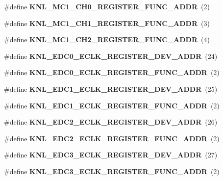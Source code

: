 \begin{DoxyCompactItemize}
\item 
\mbox{\label{types_8h_af2a15ecc6e4defaeab49cb420fd00190}} 
\#define {\bfseries K\+N\+L\+\_\+\+M\+C1\+\_\+\+C\+H0\+\_\+\+R\+E\+G\+I\+S\+T\+E\+R\+\_\+\+F\+U\+N\+C\+\_\+\+A\+D\+DR}~(2)
\item 
\mbox{\label{types_8h_a32efbe91b1b85a2d5cce155d7bc856c1}} 
\#define {\bfseries K\+N\+L\+\_\+\+M\+C1\+\_\+\+C\+H1\+\_\+\+R\+E\+G\+I\+S\+T\+E\+R\+\_\+\+F\+U\+N\+C\+\_\+\+A\+D\+DR}~(3)
\item 
\mbox{\label{types_8h_a8d12d3ada1919d5d275759e0a234c549}} 
\#define {\bfseries K\+N\+L\+\_\+\+M\+C1\+\_\+\+C\+H2\+\_\+\+R\+E\+G\+I\+S\+T\+E\+R\+\_\+\+F\+U\+N\+C\+\_\+\+A\+D\+DR}~(4)
\item 
\mbox{\label{types_8h_ac64c56290edd8bc0e35bf6284299458f}} 
\#define {\bfseries K\+N\+L\+\_\+\+E\+D\+C0\+\_\+\+E\+C\+L\+K\+\_\+\+R\+E\+G\+I\+S\+T\+E\+R\+\_\+\+D\+E\+V\+\_\+\+A\+D\+DR}~(24)
\item 
\mbox{\label{types_8h_a813ec8acab112cc0ee58659e36bd052a}} 
\#define {\bfseries K\+N\+L\+\_\+\+E\+D\+C0\+\_\+\+E\+C\+L\+K\+\_\+\+R\+E\+G\+I\+S\+T\+E\+R\+\_\+\+F\+U\+N\+C\+\_\+\+A\+D\+DR}~(2)
\item 
\mbox{\label{types_8h_ab366f1c5fe0455c1dac2ef139a4d1647}} 
\#define {\bfseries K\+N\+L\+\_\+\+E\+D\+C1\+\_\+\+E\+C\+L\+K\+\_\+\+R\+E\+G\+I\+S\+T\+E\+R\+\_\+\+D\+E\+V\+\_\+\+A\+D\+DR}~(25)
\item 
\mbox{\label{types_8h_aa605a828206d032325b5ab8f99806754}} 
\#define {\bfseries K\+N\+L\+\_\+\+E\+D\+C1\+\_\+\+E\+C\+L\+K\+\_\+\+R\+E\+G\+I\+S\+T\+E\+R\+\_\+\+F\+U\+N\+C\+\_\+\+A\+D\+DR}~(2)
\item 
\mbox{\label{types_8h_a518f427699565ecde66b895bf9402f5a}} 
\#define {\bfseries K\+N\+L\+\_\+\+E\+D\+C2\+\_\+\+E\+C\+L\+K\+\_\+\+R\+E\+G\+I\+S\+T\+E\+R\+\_\+\+D\+E\+V\+\_\+\+A\+D\+DR}~(26)
\item 
\mbox{\label{types_8h_a12d94515f0f64d8e8283f2f49402250c}} 
\#define {\bfseries K\+N\+L\+\_\+\+E\+D\+C2\+\_\+\+E\+C\+L\+K\+\_\+\+R\+E\+G\+I\+S\+T\+E\+R\+\_\+\+F\+U\+N\+C\+\_\+\+A\+D\+DR}~(2)
\item 
\mbox{\label{types_8h_a5fea0d1ad713e29296c5a66d8af0d748}} 
\#define {\bfseries K\+N\+L\+\_\+\+E\+D\+C3\+\_\+\+E\+C\+L\+K\+\_\+\+R\+E\+G\+I\+S\+T\+E\+R\+\_\+\+D\+E\+V\+\_\+\+A\+D\+DR}~(27)
\item 
\mbox{\label{types_8h_a651d1296b3b5688246f83a620a7f6ebd}} 
\#define {\bfseries K\+N\+L\+\_\+\+E\+D\+C3\+\_\+\+E\+C\+L\+K\+\_\+\+R\+E\+G\+I\+S\+T\+E\+R\+\_\+\+F\+U\+N\+C\+\_\+\+A\+D\+DR}~(2)
\item 

\end{DoxyCompactItemize}
